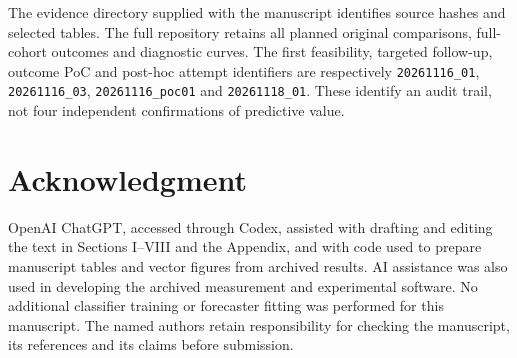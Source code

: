 \documentclass[nolineno]{ieeeaccess}
\begin{document}
The evidence directory supplied with the manuscript identifies source hashes and selected tables. The full repository retains all planned original comparisons, full-cohort outcomes and diagnostic curves. The first feasibility, targeted follow-up, outcome PoC and post-hoc attempt identifiers are respectively \texttt{20261116\_01}, \texttt{20261116\_03}, \texttt{20261116\_poc01} and \texttt{20261118\_01}. These identify an audit trail, not four independent confirmations of predictive value.

\section*{Acknowledgment}
OpenAI ChatGPT, accessed through Codex, assisted with drafting and editing the text in Sections I--VIII and the Appendix, and with code used to prepare manuscript tables and vector figures from archived results. AI assistance was also used in developing the archived measurement and experimental software. No additional classifier training or forecaster fitting was performed for this manuscript. The named authors retain responsibility for checking the manuscript, its references and its claims before submission.


\EOD
\end{document}
